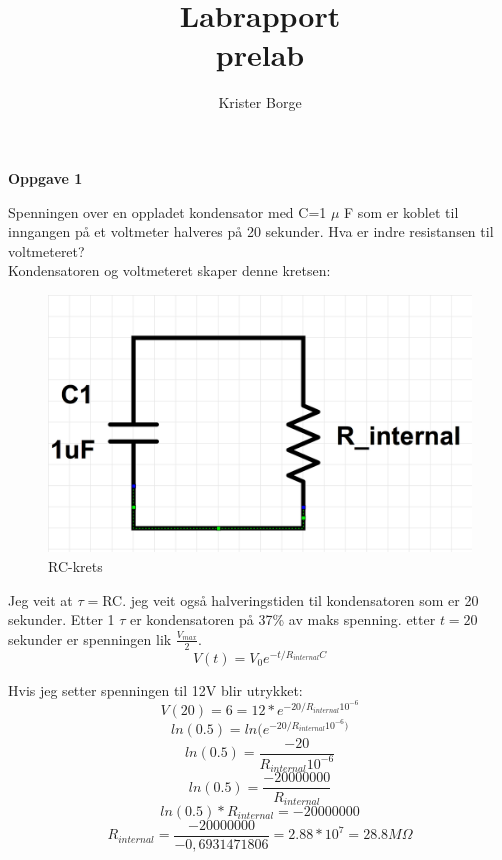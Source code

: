 \documentclass[12pt,a4paper,leqno]{report}
\author{Krister Borge}
\title{Labrapport \\ \small{prelab}}
\begin{document}
\maketitle
\textbf{Oppgave 1}

Spenningen over en oppladet kondensator med C=1 $\mu$ F
som er koblet til inngangen på et voltmeter halveres på 20 sekunder. Hva er indre resistansen til voltmeteret?\\
Kondensatoren og voltmeteret skaper denne kretsen:
\begin{figure}[H]
\caption{RC-krets}
\centering
\includegraphics[width=\textwidth]{RC-cirquit.jpg}
\end{figure}
Jeg veit at $\tau=$RC. jeg veit også halveringstiden til kondensatoren som er 20 sekunder. Etter  1 $\tau$  er kondensatoren på 37\% av maks spenning. etter $t=20$ sekunder er spenningen lik $\frac{V_{max}}{2}$.
\begin{equation}
V(t)=V_0e^{-t/R_{internal}C}
\end{equation}



Hvis jeg setter spenningen til 12V blir utrykket:
\begin{equation}
V(20)=6=12*e^{-20/R_{internal}10^{-6}}
\end{equation}
\begin{equation}
ln(0.5)=ln(e^{-20/R_{internal}10^{-6})}
\end{equation}
\begin{equation}
ln(0.5)=\frac{-20}{R_{internal}10^{-6}}
\end{equation}
\begin{equation}
ln(0.5)=\frac{-20000000}{R_{internal}}
\end{equation}
\begin{equation}
ln(0.5)*R_{internal}=-20000000
\end{equation}
\begin{equation}
R_{internal}=\frac{-20000000}{-0,6931471806}=2.88*10^7=28.8M\Omega
\end{equation}
\end{document}
